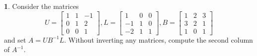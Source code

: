 \documentclass{article}
\theoremstyle{definition}
\newtheorem{prob}{}
\begin{document}
\begin{prob}
	Consider the matrices
	\[U=\begin{bmatrix}
		1 & 1 & -1\\
		0 & 1 & 2\\
		0 & 0 & 1
	\end{bmatrix}, 
L=\begin{bmatrix}
	1 & 0& 0\\
	-1 & 1 & 0\\
	-2 & 1& 1
\end{bmatrix}, 
B=\begin{bmatrix}
	1 & 2 & 3\\
	3 & 2 & 1\\
	1 & 0 & 1
\end{bmatrix} \]
and set $A=U B^{-1}L$.
Without inverting any matrices, compute the second column of $A^{-1}$.
\end{prob}
\end{document}
